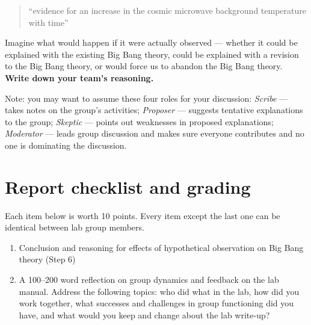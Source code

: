\begin{quote}
	``evidence for an increase in the cosmic microwave background temperature with time''
\end{quote}

\begin{steps}
	\item Imagine what would happen if it were actually observed --- whether it could be explained with the existing Big Bang theory, could be explained with a revision to the Big Bang theory, or would force us to abandon the Big Bang theory. \textbf{Write down your team's reasoning.}

    Note: you may want to assume these four roles for your discussion: \textit{Scribe} --- takes notes on the group's activities; \textit{Proposer} --- suggests tentative explanations to the group; \textit{Skeptic} --- points out weaknesses in proposed explanations; \textit{Moderator} --- leads group discussion and makes sure everyone contributes and no one is dominating the discussion.
\end{steps}

\section{Report checklist and grading}

Each item below is worth 10 points. Every item except the last one can be identical between lab group members.

\begin{enumerate}
%	
	
	\item Conclusion and reasoning for effects of hypothetical observation on Big Bang theory (Step 6)
	
	\item A 100--200 word reflection on group dynamics and feedback on the lab manual. Address the following topics: who did what in the lab, how did you work together, what successes and challenges in group functioning did you have, and what would you keep and change about the lab write-up?
\end{enumerate}